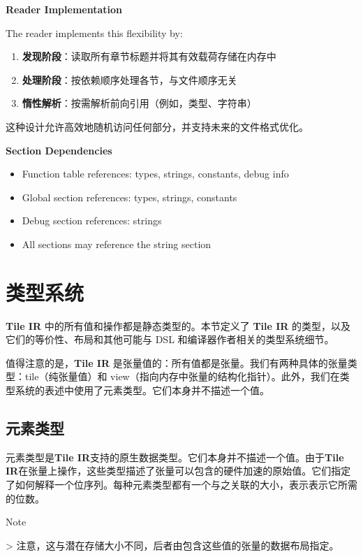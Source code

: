 \documentclass{article}
\begin{document}
\textbf{Reader Implementation}


The reader implements this flexibility by:


\begin{enumerate}
\item \textbf{发现阶段}：读取所有章节标题并将其有效载荷存储在内存中
\item \textbf{处理阶段}：按依赖顺序处理各节，与文件顺序无关
\item \textbf{惰性解析}：按需解析前向引用（例如，类型、字符串）

\end{enumerate}
这种设计允许高效地随机访问任何部分，并支持未来的文件格式优化。


\textbf{Section Dependencies}


\begin{itemize}
\item Function table references: types, strings, constants, debug info
\item Global section references: types, strings, constants
\item Debug section references: strings
\item All sections may reference the string section
\end{itemize}

\newpage
\section{类型系统}

\textbf{Tile IR} 中的所有值和操作都是静态类型的。本节定义了 \textbf{Tile IR} 的类型，以及它们的等价性、布局和其他可能与 DSL 和编译器作者相关的类型系统细节。


值得注意的是，\textbf{Tile IR} 是张量值的：所有值都是张量。我们有两种具体的张量类型：tile（纯张量值）和 view（指向内存中张量的结构化指针）。此外，我们在类型系统的表述中使用了元素类型。它们本身并不描述一个值。


\subsection{元素类型}

元素类型是\textbf{Tile IR}支持的原生数据类型。它们本身并不描述一个值。由于\textbf{Tile IR}在张量上操作，这些类型描述了张量可以包含的硬件加速的原始值。它们指定了如何解释一个位序列。每种元素类型都有一个与之关联的大小，表示表示它所需的位数。


Note

> 注意，这与潜在存储大小不同，后者由包含这些值的张量的数据布局指定。
\end{document}
